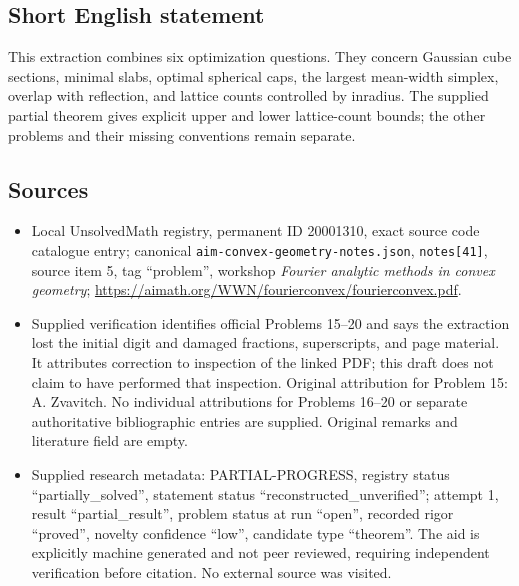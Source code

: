 \documentclass[11pt]{article}
\begin{document}
\subsection{Short English statement}
This extraction combines six optimization questions. They concern Gaussian cube sections, minimal slabs, optimal spherical caps, the largest mean-width simplex, overlap with reflection, and lattice counts controlled by inradius. The supplied partial theorem gives explicit upper and lower lattice-count bounds; the other problems and their missing conventions remain separate.
\subsection{Sources}
\begin{itemize}
\item Local UnsolvedMath registry, permanent ID 20001310, exact source code catalogue entry; canonical \texttt{aim-convex-geometry-notes.json}, \texttt{notes[41]}, source item 5, tag ``problem'', workshop \emph{Fourier analytic methods in convex geometry}; \url{https://aimath.org/WWN/fourierconvex/fourierconvex.pdf}.
\item Supplied verification identifies official Problems 15--20 and says the extraction lost the initial digit and damaged fractions, superscripts, and page material. It attributes correction to inspection of the linked PDF; this draft does not claim to have performed that inspection. Original attribution for Problem 15: A. Zvavitch. No individual attributions for Problems 16--20 or separate authoritative bibliographic entries are supplied. Original remarks and literature field are empty.
\item Supplied research metadata: PARTIAL-PROGRESS, registry status ``partially\_solved'', statement status ``reconstructed\_unverified''; attempt 1, result ``partial\_result'', problem status at run ``open'', recorded rigor ``proved'', novelty confidence ``low'', candidate type ``theorem''. The aid is explicitly machine generated and not peer reviewed, requiring independent verification before citation. No external source was visited.
\end{itemize}
\end{document}
